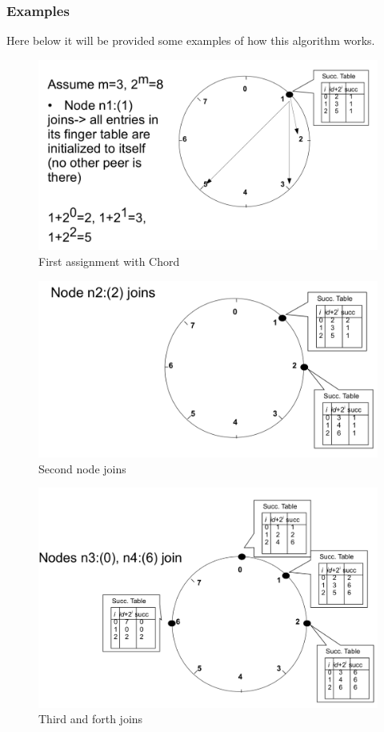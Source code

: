 \documentclass[paper=a4, fontsize=11pt]{scrartcl} %
\numberwithin{equation}{section} %
\numberwithin{figure}{section} %
\numberwithin{table}{section} %
\begin{document}
\subsubsection*{Examples}
Here below it will be provided some examples of how this algorithm works. 
 \begin{figure}[H]
  \centering
  \includegraphics[width=1\textwidth]{img/chord1.png}
  \caption{First assignment with Chord}
  \label{fig:boat1}
\end{figure} \begin{figure}[H]
  \centering
  \includegraphics[width=1\textwidth]{img/chord2.png}
  \caption{Second node joins}
  \label{fig:boat1}
\end{figure} \begin{figure}[H]
  \centering
  \includegraphics[width=1\textwidth]{img/chord3.png}
  \caption{Third and forth joins}
  \label{fig:boat1}
\end{figure}
\end{document}
